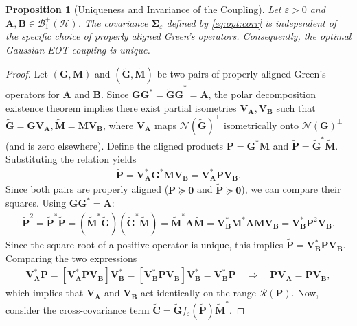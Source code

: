 \documentclass[noinfoline]{imsart}\setcounter{tocdepth}{2}
\newcommand{\m}[1]{\mathbf{#1}}
\renewcommand{\c}[1]{\mathcal{#1}}
\theoremstyle{plain}
\newtheorem{proposition}[theorem]{Proposition}
\begin{document}
\begin{proposition}[Uniqueness and Invariance of the Coupling]\label{prop:EOT:invar}
Let $\varepsilon > 0$ and $\m{A}, \m{B} \in \c{B}_{1}^{+}(\c{H})$. The covariance $\m{\Sigma}_{\varepsilon}$ defined by \eqref{eq:opt:corr} is independent of the specific choice of properly aligned Green's operators. Consequently, the optimal Gaussian EOT coupling is unique.
\end{proposition}
\begin{proof}
Let $(\m{G}, \m{M})$ and $(\tilde{\m{G}}, \tilde{\m{M}})$ be two pairs of properly aligned Green's operators for $\m{A}$ and $\m{B}$.
Since $\m{G} \m{G}^* = \tilde{\m{G}} \tilde{\m{G}}^* = \m{A}$, the polar decomposition existence theorem implies there exist partial isometries $\m{V}_{\m{A}}, \m{V}_{\m{B}}$ such that $\tilde{\m{G}} = \m{G} \m{V}_{\m{A}}, \tilde{\m{M}} = \m{M} \m{V}_{\m{B}}$, where $\m{V}_{\m{A}}$ maps $\c{N}(\tilde{\m{G}})^{\perp}$ isometrically onto $\c{N}(\m{G})^{\perp}$ (and is zero elsewhere).
Define the aligned products $\m{P} = \m{G}^* \m{M}$ and $\tilde{\m{P}} = \tilde{\m{G}}^* \tilde{\m{M}}$. Substituting the relation yields
\begin{align*}
    \tilde{\m{P}} = \m{V}_{\m{A}}^* \m{G}^* \m{M} \m{V}_{\m{B}} = \m{V}_{\m{A}}^* \m{P} \m{V}_{\m{B}}.
\end{align*}
Since both pairs are properly aligned ($\m{P} \succeq \m{0}$ and $\tilde{\m{P}} \succeq \m{0}$), we can compare their squares. Using $\m{G} \m{G}^* = \m{A}$:
\begin{align*}
    \tilde{\m{P}}^2 = \tilde{\m{P}}^* \tilde{\m{P}} = (\tilde{\m{M}}^* \tilde{\m{G}}) (\tilde{\m{G}}^* \tilde{\m{M}}) = \tilde{\m{M}}^* \m{A} \tilde{\m{M}} = \m{V}_{\m{B}}^* \m{M}^* \m{A} \m{M} \m{V}_{\m{B}} = \m{V}_{\m{B}}^* \m{P}^2 \m{V}_{\m{B}}.
\end{align*}
Since the square root of a positive operator is unique, this implies $\tilde{\m{P}} = \m{V}_{\m{B}}^* \m{P} \m{V}_{\m{B}}$.
Comparing the two expressions 
\begin{align*}
    \m{V}_{\m{A}}^* \m{P} = [\m{V}_{\m{A}}^* \m{P} \m{V}_{\m{B}}] \m{V}_{\m{B}}^* = [\m{V}_{\m{B}}^* \m{P} \m{V}_{\m{B}}] \m{V}_{\m{B}}^* = \m{V}_{\m{B}}^* \m{P} \quad \Rightarrow \quad \m{P} \m{V}_{\m{A}} = \m{P} \m{V}_{\m{B}},
\end{align*}
which implies that $\m{V}_{\m{A}}$ and $\m{V}_{\m{B}}$ act identically on the range $\overline{\c{R}(\m{P})}$.
Now, consider the cross-covariance term $\tilde{\m{C}} = \tilde{\m{G}} f_{\varepsilon}(\tilde{\m{P}}) \tilde{\m{M}}^*$.

\end{proof}
\end{document}
